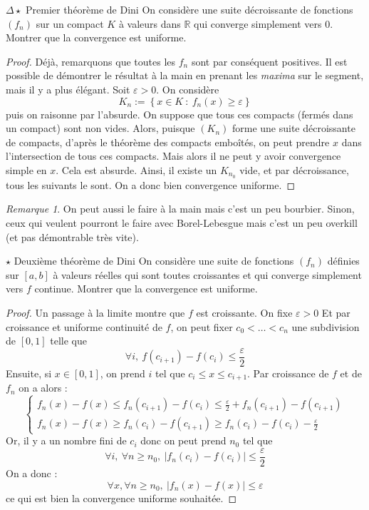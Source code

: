 \documentclass[french,a4paper]{article}
\newcommand{\R}{\mathbb{R}}
\theoremstyle{plain}
\theoremstyle{definition}
\theoremstyle{remark}
\newtheorem*{rmq}{Remarque}
\begin{document}
\begin{ex}{$\Delta\star$ Premier théorème de Dini}
	On considère une suite décroissante de fonctions $(f_n)$ sur un compact $K$ à valeurs dans $\R$ qui converge simplement vers $0$. Montrer que la convergence est uniforme.
\end{ex}
\begin{proof}
	Déjà, remarquons que toutes les $f_n$ sont par conséquent positives. Il est possible de démontrer le résultat à la main en prenant les \textit{maxima} sur le segment, mais il y a plus élégant. Soit $\varepsilon>0$. On considère $$K_n:=\left\{x\in K \ : \ f_n(x)\geqslant\varepsilon\right\}$$ puis on raisonne par l'absurde. On suppose que tous ces compacts (fermés dans un compact) sont non vides. Alors, puisque $(K_n)$ forme une suite décroissante de compacts, d'après le théorème des compacts emboîtés, on peut prendre $x$ dans l'intersection de tous ces compacts. Mais alors il ne peut y avoir convergence simple en $x$. Cela est absurde. Ainsi, il existe un $K_{n_0}$ vide, et par décroissance, tous les suivants le sont. On a donc bien convergence uniforme.
\end{proof}
\begin{rmq}
	On peut aussi le faire à la main mais c'est un peu bourbier. Sinon, ceux qui veulent pourront le faire avec Borel-Lebesgue mais c'est un peu overkill (et pas démontrable très vite).
\end{rmq}

\begin{ex}{$\star$ Deuxième théorème de Dini}
	On considère une suite de fonctions $(f_n)$ définies sur $[a,b]$ à valeurs réelles qui sont toutes croissantes et qui converge simplement vers $f$ continue. Montrer que la convergence est uniforme.
\end{ex}
\begin{proof}
	Un passage à la limite montre que $f$ est croissante. On fixe $\varepsilon>0$ Et par croissance et uniforme continuité de $f$, on peut fixer $c_0<\ldots<c_n$ une subdivision de $[0,1]$ telle que $$\forall i,\ f(c_{i+1})-f(c_i)\leqslant\frac{\varepsilon}{2}$$ Ensuite, si $x\in[0,1]$, on prend $i$ tel que $c_i\leqslant x\leqslant c_{i+1}$. Par croissance de $f$ et de $f_n$ on a alors : $$\begin{cases}
		f_n(x)-f(x)\leqslant f_n(c_{i+1})-f(c_i)\leqslant\frac{\varepsilon}{2}+f_n(c_{i+1})-f(c_{i+1})\\
		f_n(x)-f(x)\geqslant f_n(c_i)-f(c_{i+1})\geqslant f_n(c_i)-f(c_i)-\frac{\varepsilon}{2}
	\end{cases}$$ Or, il y a un nombre fini de $c_i$ donc on peut prend $n_0$ tel que $$\forall i,\ \forall n\geqslant n_0,\ \lvert f_n(c_i)-f(c_i)\rvert\leqslant\frac{\varepsilon}{2}$$ On a donc : $$\forall x,\forall n\geqslant n_0,\ \lvert f_n(x)-f(x)\rvert\leqslant\varepsilon$$ ce qui est bien la convergence uniforme souhaitée.
\end{proof}
\end{document}
